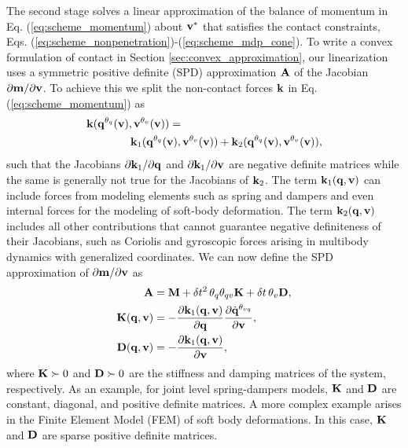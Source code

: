 The second stage solves a linear approximation of the balance of momentum in Eq.
(\ref{eq:scheme_momentum}) about ${\mathbf{v}}^*$ that satisfies the contact
constraints, Eqs. (\ref{eq:scheme_nonpenetration})-(\ref{eq:scheme_mdp_cone}). To write
a convex formulation of contact in Section \ref{sec:convex_approximation}, our
linearization uses a symmetric positive definite (SPD) approximation ${\mathbf{A}}$ of
the Jacobian $\partial {\mathbf{m}}/\partial {\mathbf{v}}$. To achieve this we split the
non-contact forces ${\mathbf{k}}$ in Eq. (\ref{eq:scheme_momentum}) as
\begin{align*}
	&{\mathbf{k}}({\mathbf{q}}^{\theta_{q}}({\mathbf{v}}), {\mathbf{v}}^{\theta_v}({\mathbf{v}})) = \\
    &\qquad\qquad {\mathbf{k}}_1({\mathbf{q}}^{\theta_{q}}({\mathbf{v}}), {\mathbf{v}}^{\theta_v}({\mathbf{v}}))+
	{\mathbf{k}}_2({\mathbf{q}}^{\theta_{q}}({\mathbf{v}}), {\mathbf{v}}^{\theta_v}({\mathbf{v}})),
\end{align*}
such that the Jacobians $\partial {\mathbf{k}}_1/\partial{\mathbf{q}}$ and $\partial
{\mathbf{k}}_1/\partial{\mathbf{v}}$ are negative definite matrices while the same is
generally not true for the Jacobians of ${\mathbf{k}}_2$. The term ${\mathbf{k}}_1({\mathbf{q}},
{\mathbf{v}})$ can include forces from modeling elements such as spring and dampers
and even internal forces for the modeling of soft-body deformation. The term
${\mathbf{k}}_2({\mathbf{q}}, {\mathbf{v}})$ includes all other contributions that cannot
guarantee negative definiteness of their Jacobians, such as Coriolis and
gyroscopic forces arising in multibody dynamics with generalized coordinates. We
can now define the SPD approximation of $\partial {\mathbf{m}}/\partial {\mathbf{v}}$ as
\begin{align}
	\mf{A}&=\mf{M}+\delta t^2\,\theta_q\theta_{qv}\mf{K}+\delta t\,\theta_v\mf{D},
	\label{eq:expression_for_A}\\
	\mf{K}(\mf{q}, \mf{v})&=-\frac{\partial \mf{k}_1(\mf{q}, \mf{v})}{\partial
	\mf{q}}\frac{\partial\dot{\mf{q}}^{\theta_{vq}}}{\partial\mf{v}},
	\label{eq:stiffness_matrix}\\
	\mf{D}(\mf{q}, \mf{v})&=-\frac{\partial \mf{k}_1(\mf{q}, \mf{v})}{\partial
	\mf{v}},
	\label{eq:dissipation_matrix}
\end{align}
where ${\mathbf{K}} \succ 0$ and ${\mathbf{D}}\succ 0$ are the stiffness and damping
matrices of the system, respectively. As an example, for joint level
spring-dampers models, ${\mathbf{K}}$ and ${\mathbf{D}}$ are constant, diagonal, and
positive definite matrices. A more complex example arises in the Finite Element
Model (FEM) of soft body deformations. In this case, ${\mathbf{K}}$ and ${\mathbf{D}}$ are
sparse positive definite matrices.

